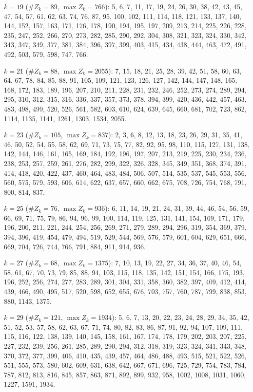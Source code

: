 \textbf{\(k=19\)} (\(\#Z_k=89\), \(\max Z_k=766\)): 5, 6, 7, 11, 17, 19, 24, 26, 30, 38, 42, 43, 45, 47, 54, 57, 61, 62, 63, 74, 76, 87, 95, 100, 102, 111, 114, 118, 121, 133, 137, 140, 144, 152, 157, 163, 171, 176, 178, 190, 194, 195, 197, 209, 213, 214, 225, 226, 228, 235, 247, 252, 266, 270, 273, 282, 285, 290, 292, 304, 308, 321, 323, 324, 330, 342, 343, 347, 349, 377, 381, 384, 396, 397, 399, 403, 415, 434, 438, 444, 463, 472, 491, 492, 503, 579, 598, 747, 766.

\textbf{\(k=21\)} (\(\#Z_k=88\), \(\max Z_k=2055\)): 7, 15, 18, 21, 25, 28, 39, 42, 51, 58, 60, 63, 64, 67, 78, 84, 85, 88, 91, 105, 109, 121, 123, 126, 127, 142, 144, 147, 148, 165, 168, 172, 183, 189, 196, 207, 210, 211, 228, 231, 232, 246, 252, 273, 274, 289, 294, 295, 310, 312, 315, 316, 336, 337, 357, 373, 378, 394, 399, 420, 436, 442, 457, 463, 483, 498, 499, 520, 526, 561, 582, 603, 610, 624, 639, 645, 660, 681, 702, 723, 862, 1114, 1135, 1141, 1261, 1303, 1534, 2055.

\textbf{\(k=23\)} (\(\#Z_k=105\), \(\max Z_k=837\)): 2, 3, 6, 8, 12, 13, 18, 23, 26, 29, 31, 35, 41, 46, 50, 52, 54, 55, 58, 62, 69, 71, 73, 75, 77, 82, 92, 95, 98, 110, 115, 127, 131, 138, 142, 144, 146, 161, 165, 169, 184, 192, 196, 197, 207, 213, 219, 225, 230, 234, 236, 238, 253, 257, 259, 261, 276, 282, 299, 322, 326, 328, 345, 349, 351, 368, 374, 391, 414, 418, 420, 422, 437, 460, 464, 483, 484, 506, 507, 514, 535, 537, 545, 553, 556, 560, 575, 579, 593, 606, 614, 622, 637, 657, 660, 662, 675, 708, 726, 754, 768, 791, 800, 814, 837.

\textbf{\(k=25\)} (\(\#Z_k=76\), \(\max Z_k=936\)): 6, 11, 14, 19, 21, 24, 31, 39, 44, 46, 54, 56, 59, 66, 69, 71, 75, 79, 86, 94, 96, 99, 100, 114, 119, 125, 131, 141, 154, 169, 171, 179, 196, 200, 211, 221, 244, 254, 256, 269, 271, 279, 289, 294, 296, 319, 354, 369, 379, 394, 396, 419, 454, 479, 494, 519, 529, 544, 569, 576, 579, 601, 604, 629, 651, 666, 669, 704, 726, 744, 766, 791, 884, 911, 914, 936.

\textbf{\(k=27\)} (\(\#Z_k=68\), \(\max Z_k=1375\)): 7, 10, 13, 19, 22, 27, 34, 36, 37, 40, 46, 54, 58, 61, 67, 70, 73, 79, 85, 88, 94, 103, 115, 118, 135, 142, 151, 154, 166, 175, 193, 196, 252, 256, 274, 277, 283, 289, 301, 304, 331, 358, 360, 382, 397, 409, 412, 414, 439, 466, 490, 495, 517, 520, 598, 652, 655, 676, 703, 757, 760, 787, 799, 838, 853, 880, 1143, 1375.

\textbf{\(k=29\)} (\(\#Z_k=121\), \(\max Z_k=1934\)): 5, 6, 7, 13, 20, 22, 23, 24, 28, 29, 34, 35, 42, 51, 52, 53, 57, 58, 62, 63, 67, 71, 74, 80, 82, 83, 86, 87, 91, 92, 94, 107, 109, 111, 115, 116, 122, 138, 139, 140, 145, 158, 161, 167, 174, 178, 179, 202, 203, 207, 225, 227, 232, 239, 256, 261, 285, 289, 290, 294, 312, 318, 319, 323, 324, 341, 343, 348, 370, 372, 377, 399, 406, 410, 435, 439, 457, 464, 486, 488, 493, 515, 521, 522, 526, 551, 555, 573, 580, 602, 609, 631, 638, 642, 667, 671, 696, 725, 729, 754, 783, 784, 787, 812, 813, 816, 845, 857, 863, 871, 892, 899, 932, 958, 1002, 1008, 1031, 1060, 1227, 1591, 1934.

